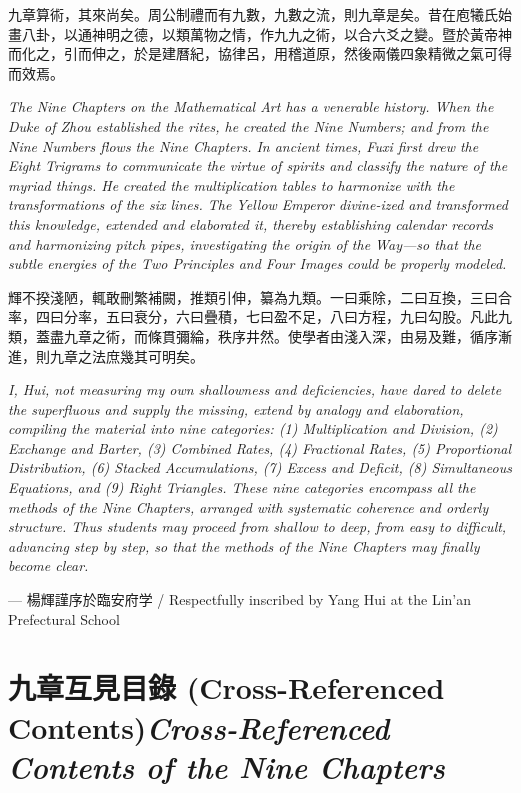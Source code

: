\documentclass[10pt,a4paper]{article}
\newcommand{\bilingual}[2]{%
  \par\smallskip\noindent
  \begin{minipage}[t]{0.48\textwidth}
    \setlength{\parindent}{0pt}
    \setlength{\parskip}{4pt plus 1pt minus 1pt}
    #1
  \end{minipage}%
  \hfill
  \begin{minipage}[t]{0.48\textwidth}
    \setlength{\parindent}{0pt}
    \setlength{\parskip}{4pt plus 1pt minus 1pt}
    \small\textit{#2}%
  \end{minipage}
  \par\smallskip
}
\newcommand{\bilingualsection}[2]{%
  \section{#1\hfill\textnormal{\small\textit{#2}}}
}
\begin{document}
\bilingual{%
九章算術，其來尚矣。周公制禮而有九數，九數之流，則九章是矣。昔在庖犧氏始畫八卦，以通神明之德，以類萬物之情，作九九之術，以合六爻之變。暨於黃帝神而化之，引而伸之，於是建曆紀，協律呂，用稽道原，然後兩儀四象精微之氣可得而效焉。
}{%
The \textit{Nine Chapters on the Mathematical Art} has a venerable history. When the Duke of Zhou established the rites, he created the Nine Numbers; and from the Nine Numbers flows the \textit{Nine Chapters}. In ancient times, Fuxi first drew the Eight Trigrams to communicate the virtue of spirits and classify the nature of the myriad things. He created the multiplication tables to harmonize with the transformations of the six lines. The Yellow Emperor divine-ized and transformed this knowledge, extended and elaborated it, thereby establishing calendar records and harmonizing pitch pipes, investigating the origin of the Way---so that the subtle energies of the Two Principles and Four Images could be properly modeled.
}

\bilingual{%
輝不揆淺陋，輒敢刪繁補闕，推類引伸，纂為九類。一曰乘除，二曰互換，三曰合率，四曰分率，五曰衰分，六曰疊積，七曰盈不足，八曰方程，九曰勾股。凡此九類，蓋盡九章之術，而條貫彌綸，秩序井然。使學者由淺入深，由易及難，循序漸進，則九章之法庶幾其可明矣。
}{%
I, Hui, not measuring my own shallowness and deficiencies, have dared to delete the superfluous and supply the missing, extend by analogy and elaboration, compiling the material into nine categories: (1) Multiplication and Division, (2) Exchange and Barter, (3) Combined Rates, (4) Fractional Rates, (5) Proportional Distribution, (6) Stacked Accumulations, (7) Excess and Deficit, (8) Simultaneous Equations, and (9) Right Triangles. These nine categories encompass all the methods of the \textit{Nine Chapters}, arranged with systematic coherence and orderly structure. Thus students may proceed from shallow to deep, from easy to difficult, advancing step by step, so that the methods of the \textit{Nine Chapters} may finally become clear.
}

\begin{flushright}
--- 楊輝謹序於臨安府学 / Respectfully inscribed by Yang Hui at the Lin'an Prefectural School
\end{flushright}

\newpage

\bilingualsection{九章互見目錄 (Cross-Referenced Contents)}{Cross-Referenced Contents of the Nine Chapters}
\end{document}
